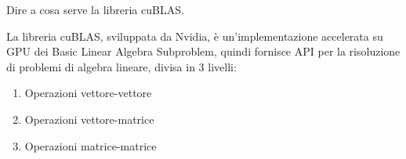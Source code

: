 \begin{questions}
    \question Dire a cosa serve la libreria cuBLAS.
    
    \begin{solution}
        La libreria cuBLAS, sviluppata da Nvidia, è un'implementazione accelerata su GPU dei Basic Linear Algebra Subproblem, quindi fornisce API per la risoluzione di problemi di algebra lineare, divisa in 3 livelli: 
        \begin{enumerate}
            \item Operazioni vettore-vettore
            
            \item Operazioni vettore-matrice
            
            \item Operazioni matrice-matrice
        \end{enumerate}
    \end{solution}
    
\end{questions}